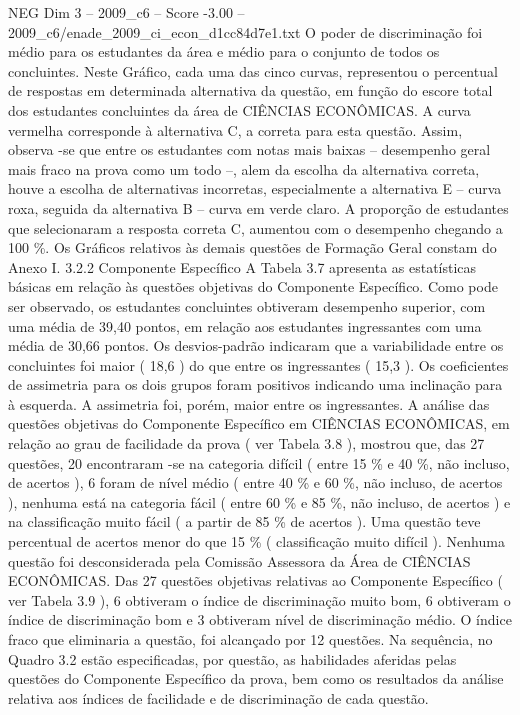 \begin{textsample}{NEG Dim 3 – 2009\_c6 – Score -3.00 – 2009\_c6/enade\_2009\_ci\_econ\_d1cc84d7e1.txt}
O poder de discriminação foi médio para os estudantes da área e médio para o conjunto de todos os concluintes.
Neste Gráfico, cada uma das cinco curvas, representou o percentual de respostas em determinada alternativa da questão, em função do escore total dos estudantes concluintes da área de CIÊNCIAS ECONÔMICAS.
A curva vermelha corresponde à alternativa C, a correta para esta questão.
Assim, observa -se que entre os estudantes com notas mais baixas – desempenho geral mais fraco na prova como um todo –, alem da escolha da alternativa correta, houve a escolha de alternativas incorretas, especialmente a alternativa E – curva roxa, seguida da alternativa B – curva em verde claro.
A proporção de estudantes que selecionaram a resposta correta C, aumentou com o desempenho chegando a 100 \%.
Os Gráficos relativos às demais questões de Formação Geral constam do Anexo I. 3.2.2 Componente Específico A Tabela 3.7 apresenta as estatísticas básicas em relação às questões objetivas do Componente Específico.
Como pode ser observado, os estudantes concluintes obtiveram desempenho superior, com uma média de 39,40 pontos, em relação aos estudantes ingressantes com uma média de 30,66 pontos.
Os desvios-padrão indicaram que a variabilidade entre os concluintes foi maior ( 18,6 ) do que entre os ingressantes ( 15,3 ).
Os coeficientes de assimetria para os dois grupos foram positivos indicando uma inclinação para à esquerda.
A assimetria foi, porém, maior entre os ingressantes.
A análise das questões objetivas do Componente Específico em CIÊNCIAS ECONÔMICAS, em relação ao grau de facilidade da prova ( ver Tabela 3.8 ), mostrou que, das 27 questões, 20 encontraram -se na categoria difícil ( entre 15 \% e 40 \%, não incluso, de acertos ), 6 foram de nível médio ( entre 40 \% e 60 \%, não incluso, de acertos ), nenhuma está na categoria fácil ( entre 60 \% e 85 \%, não incluso, de acertos ) e na classificação muito fácil ( a partir de 85 \% de acertos ).
Uma questão teve percentual de acertos menor do que 15 \% ( classificação muito difícil ).
Nenhuma questão foi desconsiderada pela Comissão Assessora da Área de CIÊNCIAS ECONÔMICAS.
Das 27 questões objetivas relativas ao Componente Específico ( ver Tabela 3.9 ), 6 obtiveram o índice de discriminação muito bom, 6 obtiveram o índice de discriminação bom e 3 obtiveram nível de discriminação médio.
O índice fraco que eliminaria a questão, foi alcançado por 12 questões.
Na sequência, no Quadro 3.2 estão especificadas, por questão, as habilidades aferidas pelas questões do Componente Específico da prova, bem como os resultados da análise relativa aos índices de facilidade e de discriminação de cada questão.

\end{textsample}
